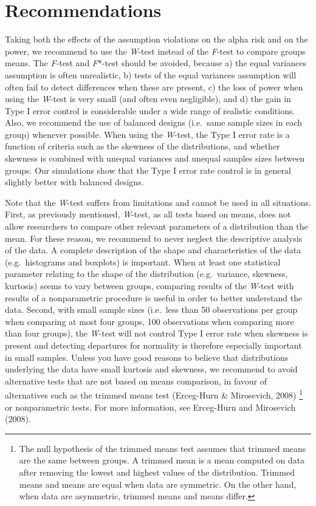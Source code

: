 \documentclass[man,floatsintext]{apa6}
\let\rmarkdownfootnote\footnote%
\def\footnote{\protect\rmarkdownfootnote}
\begin{document}
\hypertarget{recommendations}{%
\section{Recommendations}\label{recommendations}}

Taking both the effects of the assumption violations on the alpha risk and on the power, we recommend to use the \emph{W}-test instead of the \emph{F}-test to compare groups means. The \emph{F}-test and \emph{F}*-test should be avoided, because a) the equal variances assumption is often unrealistic, b) tests of the equal variances assumption will often fail to detect differences when these are present, c) the loss of power when using the \emph{W}-test is very small (and often even negligible), and d) the gain in Type I error control is considerable under a wide range of realistic conditions. Also, we recommend the use of balanced designs (i.e.~same sample sizes in each group) whenever possible. When using the \emph{W}-test, the Type I error rate is a function of criteria such as the skewness of the distributions, and whether skewness is combined with unequal variances and unequal samples sizes between groups. Our simulations show that the Type I error rate control is in general slightly better with balanced designs.

Note that the \emph{W}-test suffers from limitations and cannot be used in all situations. First, as previously mentioned, \emph{W}-test, as all tests based on means, does not allow researchers to compare other relevant parameters of a distribution than the mean. For these reason, we recommend to never neglect the descriptive analysis of the data. A complete description of the shape and characteristics of the data (e.g.~histograms and boxplots) is important. When at least one statistical parameter relating to the shape of the distribution (e.g.~variance, skewness, kurtosis) seems to vary between groups, comparing results of the \emph{W}-test with results of a nonparametric procedure is useful in order to better understand the data. Second, with small sample sizes (i.e.~less than 50 observations per group when comparing at most four groups, 100 observations when comparing more than four groups), the \emph{W}-test will not control Type I error rate when skewness is present and detecting departures for normality is therefore especially important in small samples. Unless you have good reasons to believe that distributions underlying the data have small kurtosis and skewness, we recommend to avoid alternative tests that are not based on means comparison, in favour of alternatives such as the trimmed means test (Erceg-Hurn \& Mirosevich, 2008) \footnote{The null hypothesis of the trimmed means test assumes that trimmed means are the same between groups. A trimmed mean is a mean computed on data after removing the lowest and highest values of the distribution. Trimmed means and means are equal when data are symmetric. On the other hand, when data are asymmetric, trimmed means and means differ.} or nonparametric tests. For more information, see Erceg-Hurn and Mirosevich (2008).
\end{document}
